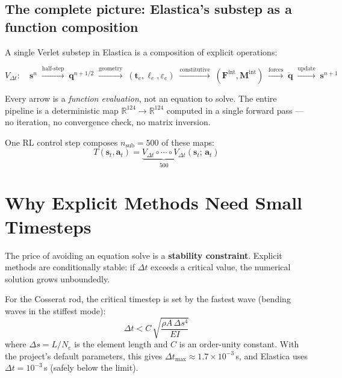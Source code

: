 \documentclass[11pt]{article}
\newcommand{\vect}[1]{\mathbf{#1}}
\newcommand{\Real}{\mathbb{R}}
\begin{document}
\subsection{The complete picture: Elastica's substep as a function composition}

A single Verlet substep in Elastica is a composition of explicit operations:

\begin{equation}
  V_{\Delta t}: \quad
  \vect{s}^n
  \;\xrightarrow{\text{half-step}}\;
  \vect{q}^{n+1/2}
  \;\xrightarrow{\text{geometry}}\;
  (\vect{t}_e, \ell_e, \varepsilon_e)
  \;\xrightarrow{\text{constitutive}}\;
  (\vect{F}^{\text{int}}, \vect{M}^{\text{int}})
  \;\xrightarrow{\text{forces}}\;
  \ddot{\vect{q}}
  \;\xrightarrow{\text{update}}\;
  \vect{s}^{n+1}
  \label{eq:pipeline}
\end{equation}

Every arrow is a \emph{function evaluation}, not an equation to solve.
The entire pipeline is a deterministic map $\Real^{124} \to \Real^{124}$ computed in a single forward pass --- no iteration, no convergence check, no matrix inversion.

One RL control step composes $n_{\text{sub}} = 500$ of these maps:
\begin{equation}
  T(\vect{s}_t, \vect{a}_t) = \underbrace{V_{\Delta t} \circ \cdots \circ V_{\Delta t}}_{500}(\vect{s}_t;\, \vect{a}_t)
  \label{eq:transition-composition}
\end{equation}

\section{Why Explicit Methods Need Small Timesteps}
\label{sec:stability}

The price of avoiding an equation solve is a \textbf{stability constraint}.
Explicit methods are conditionally stable: if $\Delta t$ exceeds a critical value, the numerical solution grows unboundedly.

For the Cosserat rod, the critical timestep is set by the fastest wave (bending waves in the stiffest mode):
\begin{equation}
  \Delta t < C\,\sqrt{\frac{\rho A\,\Delta s^4}{EI}}
  \label{eq:cfl}
\end{equation}
where $\Delta s = L/N_e$ is the element length and $C$ is an order-unity constant.
With the project's default parameters, this gives $\Delta t_{\max} \approx 1.7 \times 10^{-3}$\,s, and Elastica uses $\Delta t = 10^{-3}$\,s (safely below the limit).
\end{document}
